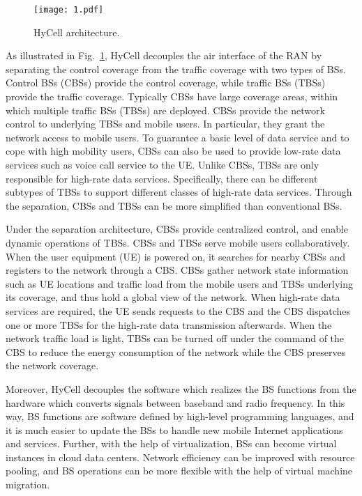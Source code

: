 \documentclass[conference]{IEEEtran}
\begin{document}
\begin{figure}[!t]
  \centering
  \texttt{[image: 1.pdf]}
  \caption{HyCell architecture.}
  \label{fig:arch}
\end{figure}



As illustrated in Fig.~\ref{fig:arch}, HyCell decouples the air interface of the
RAN by separating the control coverage from the traffic coverage with two types of BSs.
Control BSs (CBSs) provide the control coverage, while traffic BSs (TBSs)
provide the traffic coverage.
Typically CBSs have large coverage areas, within which
multiple traffic BSs (TBSs) are deployed.
CBSs provide the network control to underlying TBSs and mobile users.
In particular, they grant the network access to mobile users.
To guarantee a basic level of data service and to cope with high mobility users,
CBSs can also be used to provide low-rate data services such as voice call service to the UE.
Unlike CBSs, TBSs are only responsible for high-rate data services.
Specifically, there can be different subtypes of TBSs
to support different classes of high-rate data services.
Through the separation, CBSs and TBSs can be more simplified than
conventional BSs.



Under the separation architecture, CBSs provide centralized control,
and enable dynamic operations of TBSs. CBSs and TBSs serve mobile users
collaboratively.
When the user equipment (UE) is powered on,
it searches for nearby CBSs and registers to the network through a CBS.
CBSs gather network state information such as UE locations and traffic load
from the mobile users and TBSs underlying its coverage,
and thus hold a global view of the network.
When high-rate data services are required, the UE sends requests to the CBS
and the CBS dispatches one or more TBSs for the high-rate data transmission afterwards.
When the network traffic load is light, TBSs can be turned off under the
command of the CBS to reduce the
energy consumption of the network while the CBS preserves the network coverage.



Moreover, HyCell decouples the software which realizes the BS functions from the
hardware which converts signals between baseband and radio frequency.
In this way, BS functions are software defined by high-level programming languages, and
it is much easier to update the BSs to handle
new mobile Internet applications and services. Further, with the help of
virtualization, BSs can become virtual instances in cloud data centers.
Network efficiency can be improved with resource pooling, and BS operations can
be more flexible with the help of virtual machine migration.
\end{document}
